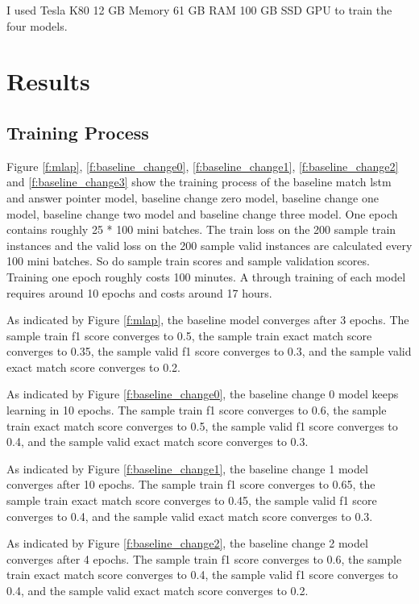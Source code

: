 \documentclass[modernstyle,12pt]{sjsuthesis}
\theoremstyle{definition}
\begin{document}
I used Tesla K80 12 GB Memory 61 GB RAM 100 GB SSD GPU to train the four models.

\section{Results}
\subsection{Training Process}

Figure \ref{f:mlap}, \ref{f:baseline_change0}, \ref{f:baseline_change1}, \ref{f:baseline_change2} and \ref{f:baseline_change3} show the training process of the baseline match lstm and answer pointer model, baseline change zero model, baseline change one model, baseline change two model and  baseline change three model. One epoch contains roughly 25 * 100 mini batches. The train loss on the 200 sample train instances and the valid loss on the 200 sample valid instances are calculated every 100 mini batches. So do sample train scores and sample validation scores. Training one epoch roughly costs 100 minutes. A through training of each model requires around 10 epochs and costs around 17 hours.

As indicated by Figure \ref{f:mlap}, the baseline model converges after 3 epochs. The sample train f1 score converges to 0.5, the sample train exact match score converges to 0.35, the sample valid f1 score converges to 0.3, and the sample valid exact match score converges to 0.2.

As indicated by Figure \ref{f:baseline_change0}, the baseline change 0 model keeps learning in 10 epochs. The sample train f1 score converges to 0.6, the sample train exact match score converges to 0.5, the sample valid f1 score converges to 0.4, and the sample valid exact match score converges to 0.3.

As indicated by Figure \ref{f:baseline_change1}, the baseline change 1 model converges after 10 epochs. The sample train f1 score converges to 0.65, the sample train exact match score converges to 0.45, the sample valid f1 score converges to 0.4, and the sample valid exact match score converges to 0.3.

As indicated by Figure \ref{f:baseline_change2}, the baseline change 2 model converges after 4 epochs. The sample train f1 score converges to 0.6, the sample train exact match score converges to 0.4, the sample valid f1 score converges to 0.4, and the sample valid exact match score converges to 0.2.
\end{document}
